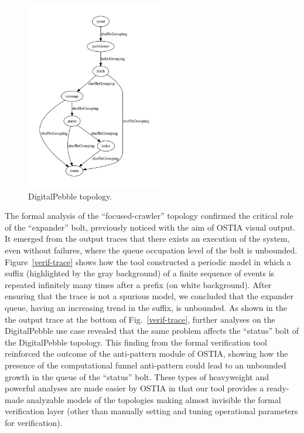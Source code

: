 \documentclass[smallextended]{svjour3}       %
\newcommand{\comment}[1]{{\textbf{\color{red}[#1]}}}
\begin{document}
\begin{figure}
\begin{center}
\includegraphics[width=6cm,draft]{fig10}
		\caption{DigitalPebble topology.}
		\label{dp}
		\end{center}
\end{figure}
The formal analysis of the ``focused-crawler'' topology confirmed the critical role of the ``expander'' bolt, previously noticed with the aim of OSTIA visual output. It emerged from the output traces that there exists an execution of the system, even without failures, where the queue occupation level of the bolt is unbounded. Figure~\ref{verif-trace} shows how the tool constructed a periodic model in which a suffix (highlighted by the gray background) of a finite sequence of events is repeated infinitely many times after a prefix (on white background). After ensuring that the trace is not a spurious model, we concluded that the expander queue, having an increasing trend in the suffix, is unbounded. 
As shown in the the output trace at the bottom of Fig.~\ref{verif-trace}, further analyses on the DigitalPebble use case revealed that the same problem affects the ``status'' bolt of the DigitalPebble topology. This finding from the formal verification tool reinforced the outcome of the anti-pattern module of OSTIA, showing how the presence of the computational funnel anti-pattern could lead to an unbounded growth in the queue of the ``status'' bolt.
These types of heavyweight and powerful analyses are made easier by OSTIA in that our tool provides a ready-made analyzable models of the topologies making almost invisible the formal verification layer (other than manually setting and tuning operational parameters for verification). %
%
\end{document}
